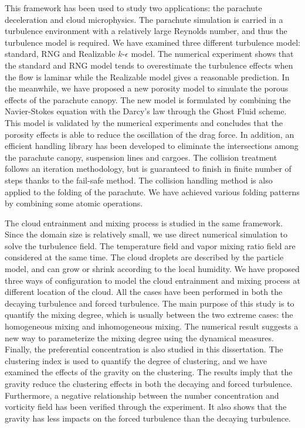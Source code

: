 This framework has been used to study two applications: the parachute deceleration and cloud microphysics. The parachute simulation is carried in a turbulence environment with a relatively large Reynolds number, and thus the turbulence model is required. We have examined three different turbulence model: standard, RNG and Realizable $k$-$\epsilon$ model. The numerical experiment shows that the standard and RNG model tends to overestimate the turbulence effects when the flow is laminar while the Realizable model gives a reasonable prediction. In the meanwhile, we have proposed a new porosity model to simulate the porous effects of the parachute canopy. The new model is formulated by combining the Navier-Stokes equation with the Darcy's law through the Ghost Fluid scheme. This model is validated by the numerical experiments and concludes that the porosity effects is able to reduce the oscillation of the drag force. In addition, an efficient handling library has been developed to eliminate the intersections among the parachute canopy, suspension lines and cargoes. The collision treatment follows an iteration methodology, but is guaranteed to finish in finite number of steps thanks to the fail-safe method. The collision handling method is also applied to the folding of the parachute. We have achieved various folding patterns by combining some atomic operations.

The cloud entrainment and mixing process is studied in the same framework. Since the domain size is relatively small, we use direct numerical simulation to solve the turbulence field. The temperature field and vapor mixing ratio field are considered at the same time. The cloud droplets are described by the particle model, and can grow or shrink according to the local humidity. We have proposed three ways of configuration to model the cloud entrainment and mixing process at different location of the cloud. All the cases have been performed in both the decaying turbulence and forced turbulence. The main purpose of this study is to quantify the mixing degree, which is usually between the two extreme cases: the homogeneous mixing and inhomogeneous mixing. The numerical result suggests a new way to parameterize the mixing degree using the dynamical measures. Finally, the preferential concentration is also studied in this dissertation. The clustering index is used to quantify the degree of clustering, and we have examined the effects of the gravity on the clustering. The results imply that the gravity reduce the clustering effects in both the decaying and forced turbulence. Furthermore, a negative relationship between the number concentration and vorticity field has been verified through the experiment. It also shows that the gravity has less impacts on the forced turbulence than the decaying turbulence.
 
